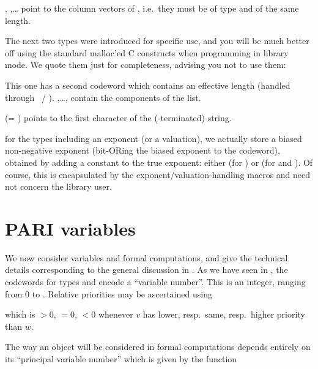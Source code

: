  ,
,\dots {} point to the column vectors of ,
i.e.~they must be of type  and of the same length.

\noindent The next two types were introduced for specific  use, and you
will be much better off using the standard malloc'ed C constructs when
programming in library mode. We quote them just for completeness, advising
you not to use them:

 This one has a
second codeword which contains an effective length (handled through
~/ ). ,\dots, 
contain the components of the list.

%

 (= ) points to the first character of the
(-terminated) string.

 for the types including an exponent (or a
valuation), we actually store a biased non-negative exponent (bit-ORing the
biased exponent to the codeword), obtained by adding a constant to the true
exponent: either  (for ) or  (for
 and ). Of course, this is encapsulated by the
exponent/valuation-handling macros and need not concern the library user.

\section{PARI variables}\label{se:vars} 

\noindent We now consider variables and formal computations, and give the
technical details corresponding to the general discussion in
. As we have seen in , the codewords for
types  and  encode a ``variable number''. This is an
integer, ranging from $0$ to . Relative priorities may be
ascertained using


which is $>0$, $=0$, $<0$ whenever $v$ has lower, resp.~same, resp.~higher
priority than $w$.

The way an object will be considered in formal computations depends entirely
on its ``principal variable number'' which is given by the function

